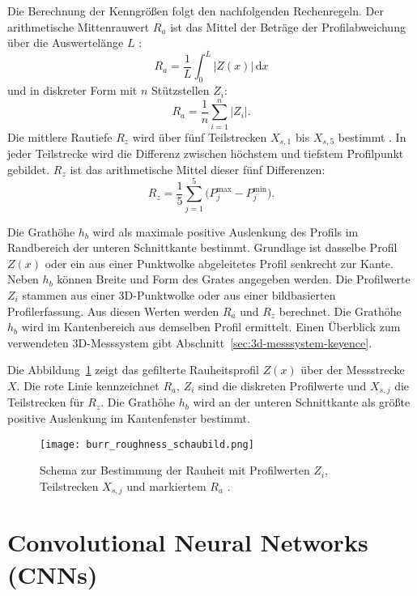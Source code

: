 Die Berechnung der Kenngrößen folgt den nachfolgenden Rechenregeln. Der arithmetische Mittenrauwert \(R_a\) ist das Mittel der Beträge der Profilabweichung über die Auswertelänge \(L\) \parencite{MitutoyoQuickGuide}:
\[
R_a=\frac{1}{L}\int_{0}^{L}\lvert Z(x)\rvert\,\mathrm{d}x
\]
und in diskreter Form mit \(n\) Stützstellen \(Z_i\):
\[
R_a=\frac{1}{n}\sum_{i=1}^{n}\lvert Z_i\rvert.
\]
Die mittlere Rautiefe \(R_z\) wird über fünf Teilstrecken \(X_{s,1}\) bis \(X_{s,5}\) bestimmt \parencite{KeyenceISO4287}. In jeder Teilstrecke wird die Differenz zwischen höchstem und tiefstem Profilpunkt gebildet. \(R_z\) ist das arithmetische Mittel dieser fünf Differenzen:
\[
R_z=\frac{1}{5}\sum_{j=1}^{5}\bigl(P^{\max}_{j}-P^{\min}_{j}\bigr).
\]

Die Grathöhe \(h_b\) wird als maximale positive Auslenkung des Profils im Randbereich der unteren Schnittkante bestimmt. Grundlage ist dasselbe Profil \(Z(x)\) oder ein aus einer Punktwolke abgeleitetes Profil senkrecht zur Kante. Neben \(h_b\) können Breite und Form des Grates angegeben werden.
Die Profilwerte \(Z_i\) stammen aus einer 3D-Punktwolke oder aus einer bildbasierten Profilerfassung. Aus diesen Werten werden \(R_a\) und \(R_z\) berechnet. Die Grathöhe \(h_b\) wird im Kantenbereich aus demselben Profil ermittelt. Einen Überblick zum verwendeten 3D-Messsystem gibt Abschnitt~\ref{sec:3d-messsystem-keyence}.

Die Abbildung~\ref{fig:roughness-profile} zeigt das gefilterte Rauheitsprofil \(Z(x)\) über der Messstrecke \(X\).
Die rote Linie kennzeichnet \(R_a\), \(Z_i\) sind die diskreten Profilwerte und \(X_{s,j}\) die Teilstrecken für \(R_z\). Die Grathöhe \(h_b\) wird an der unteren Schnittkante als größte positive Auslenkung im Kantenfenster bestimmt.

\begin{figure}[htbp]
  \centering
  \texttt{[image: burr\_roughness\_schaubild.png]}
  \caption[Schema zur Bestimmung der Rauheit]{Schema zur Bestimmung der Rauheit mit Profilwerten \(Z_i\), Teilstrecken \(X_{s,j}\) und markiertem \(R_a\) \parencite{Timesavers_Rauheit_Ra}.}
  \label{fig:roughness-profile}
\end{figure}

\section{Convolutional Neural Networks (CNNs)}
\label{sec:cnns}

